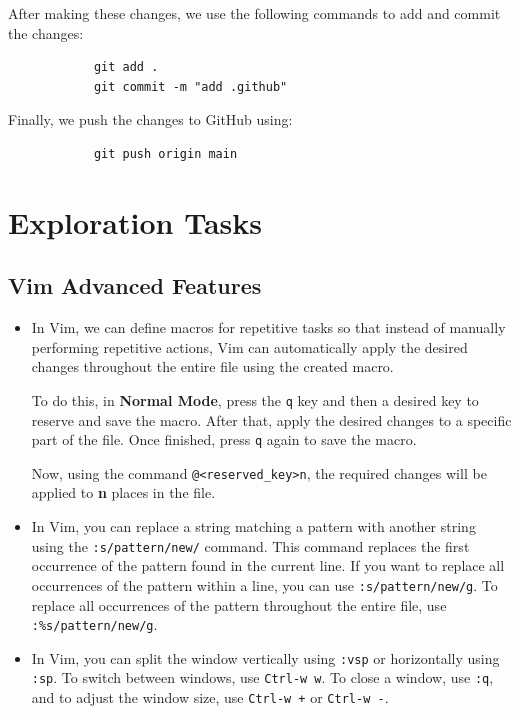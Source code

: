 \documentclass{article}
\begin{document}
            After making these changes, we use the following commands to add and commit the changes:
            \begin{verbatim}
            git add .
            git commit -m "add .github"
            \end{verbatim}
            Finally, we push the changes to GitHub using:
            \begin{verbatim}
            git push origin main
            \end{verbatim}


\section{Exploration Tasks}
    \subsection{Vim Advanced Features}
        \begin{itemize}
            \item 
            In Vim, we can define macros for repetitive tasks so that instead of manually performing repetitive actions, Vim can automatically apply the desired changes throughout the entire file using the created macro. 
    
            To do this, in \textbf{Normal Mode}, press the \texttt{q} key and then a desired key to reserve and save the macro. After that, apply the desired changes to a specific part of the file. Once finished, press \texttt{q} again to save the macro. 
    
            Now, using the command \texttt{@<reserved\_key>n}, the required changes will be applied to \textbf{n} places in the file.

            
            \item 
            In Vim, you can replace a string matching a pattern with another string using the \texttt{:s/pattern/new/} command. This command replaces the first occurrence of the pattern found in the current line. If you want to replace all occurrences of the pattern within a line, you can use \texttt{:s/pattern/new/g}. To replace all occurrences of the pattern throughout the entire file, use \texttt{:\%s/pattern/new/g}.

            \item 
            In Vim, you can split the window vertically using \texttt{:vsp} or horizontally using \texttt{:sp}. To switch between windows, use \texttt{Ctrl-w w}. To close a window, use \texttt{:q}, and to adjust the window size, use \texttt{Ctrl-w +} or \texttt{Ctrl-w -}.

        \end{itemize} 
\end{document}
